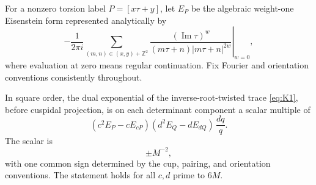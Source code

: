 For a nonzero torsion label \(P=[x\tau+y]\), let \(E_P\) be the algebraic
weight-one Eisenstein form represented analytically by
\[
 -\frac{1}{2\pi i}\left.
 \sum_{(m,n)\in(x,y)+\mathbb Z^2}
 \frac{(\operatorname{Im}\tau)^w}
 {(m\tau+n)|m\tau+n|^{2w}}\right|_{w=0},
\]
where evaluation at zero means regular continuation.  Fix Fourier and
orientation conventions consistently throughout.

\begin{proposition}\label{prop:siegel-reciprocity}
In square order, the dual exponential of the inverse-root-twisted trace
\eqref{eq:K1}, before cuspidal projection, is on each determinant component
a scalar multiple of
\[
  (c^2 E_P-c E_{cP})(d^2 E_Q-d E_{dQ})\,\frac{dq}{q}.     \tag{K2}\label{eq:K2}
\]
The scalar is
\[
                              \pm M^{-2},               \tag{K3}\label{eq:K3}
\]
with one common sign determined by the cup, pairing, and orientation
conventions.  The statement holds for all \(c,d\) prime to \(6M\).
\end{proposition}

